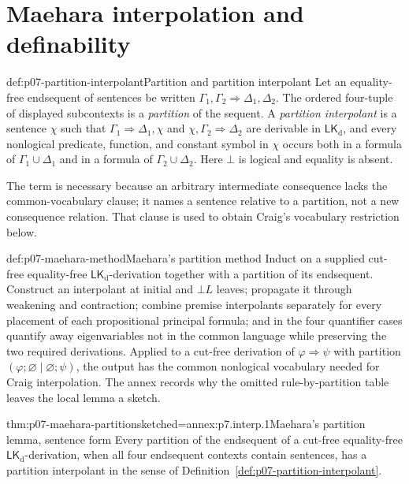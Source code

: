\section{Maehara interpolation and definability}

\begin{hbdefinition}{def:p07-partition-interpolant}{Partition and partition interpolant}
Let an equality-free endsequent of sentences be written
\(\Gamma_1,\Gamma_2\Rightarrow\Delta_1,\Delta_2\).  The ordered four-tuple of
displayed subcontexts is a \emph{partition} of the sequent.  A
\emph{partition interpolant} is a sentence \(\chi\) such that
\(\Gamma_1\Rightarrow\Delta_1,\chi\) and
\(\chi,\Gamma_2\Rightarrow\Delta_2\) are derivable in
\(\mathsf{LK}_{\mathrm d}\), and every nonlogical
predicate, function, and constant symbol in \(\chi\) occurs both in a formula
of \(\Gamma_1\cup\Delta_1\) and in a formula of
\(\Gamma_2\cup\Delta_2\).  Here \(\bot\) is logical and equality is absent.

The term is necessary because an arbitrary intermediate consequence lacks
the common-vocabulary clause; it names a sentence relative to a partition,
not a new consequence relation.  That clause is used to obtain Craig's
vocabulary restriction below.
\end{hbdefinition}

\begin{hbmethod}{def:p07-maehara-method}{Maehara's partition method}
Induct on a supplied cut-free equality-free
\(\mathsf{LK}_{\mathrm d}\)-derivation together with a partition of its
endsequent.  Construct an interpolant at initial and \(\bot L\) leaves;
propagate it through weakening and contraction; combine premise interpolants
separately for every placement of each propositional principal formula; and
in the four quantifier cases quantify away eigenvariables not in the common
language while preserving the two required derivations.  Applied to a
cut-free derivation of \(\varphi\Rightarrow\psi\) with partition
\((\varphi;\varnothing\mid\varnothing;\psi)\), the output has the common
nonlogical vocabulary needed for Craig interpolation.  The annex records why
the omitted rule-by-partition table leaves the local lemma a sketch.
\end{hbmethod}

\begin{hblemma}{thm:p07-maehara-partition}{sketched=annex:p7.interp.1}{Maehara's partition lemma, sentence form}
Every partition of the endsequent of a cut-free equality-free
\(\mathsf{LK}_{\mathrm d}\)-derivation, when all four endsequent contexts
contain sentences, has a partition interpolant in the sense of
Definition~\ref{def:p07-partition-interpolant}.
\end{hblemma}

